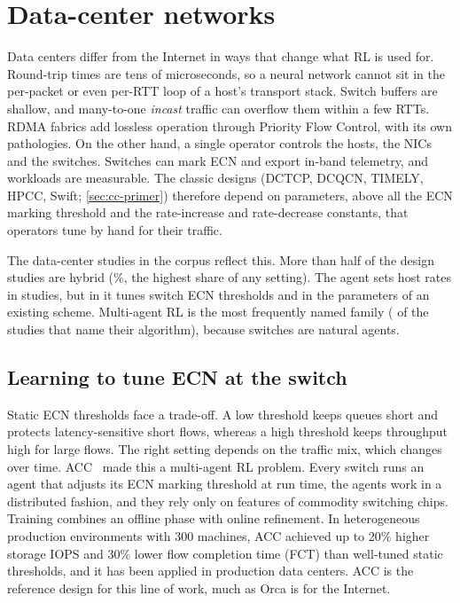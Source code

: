 \chapter{Data-center networks}
\label{ch:datacenter}

Data centers differ from the Internet in ways that change what RL is used for. Round-trip times are tens of microseconds, so a neural network cannot sit in the per-packet or even per-RTT loop of a host's transport stack. Switch buffers are shallow, and many-to-one \emph{incast} traffic can overflow them within a few RTTs. RDMA fabrics add lossless operation through Priority Flow Control, with its own pathologies. On the other hand, a single operator controls the hosts, the NICs and the switches. Switches can mark ECN and export in-band telemetry, and workloads are measurable. The classic designs (DCTCP, DCQCN, TIMELY, HPCC, Swift; \cref{sec:cc-primer}) therefore depend on parameters, above all the ECN marking threshold and the rate-increase and rate-decrease constants, that operators tune by hand for their traffic.

The \nChDatacenterN{} data-center studies in the corpus reflect this. More than half of the \nChDatacenterDesign{} design studies are hybrid (\nChDatacenterPctHybrid\%, the highest share of any setting). The agent sets host rates in \nChDatacenterActRate{} studies, but in \nChDatacenterActEcn{} it tunes switch ECN thresholds and in \nChDatacenterActParam{} the parameters of an existing scheme. Multi-agent RL is the most frequently named family (\nChDatacenterMarl{} of the \nChDatacenterFamKnown{} studies that name their algorithm), because switches are natural agents.

\section{Learning to tune ECN at the switch}
\label{sec:dc-ecn}

Static ECN thresholds face a trade-off. A low threshold keeps queues short and protects latency-sensitive short flows, whereas a high threshold keeps throughput high for large flows. The right setting depends on the traffic mix, which changes over time. ACC~\cite{yan2021acc} made this a multi-agent RL problem. Every switch runs an agent that adjusts its ECN marking threshold at run time, the agents work in a distributed fashion, and they rely only on features of commodity switching chips. Training combines an offline phase with online refinement. In heterogeneous production environments with 300 machines, ACC achieved up to 20\% higher storage IOPS and 30\% lower flow completion time (FCT) than well-tuned static thresholds, and it has been applied in production data centers. ACC is the reference design for this line of work, much as Orca is for the Internet.

